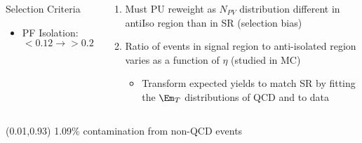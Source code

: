 \begin{frame}
\begin{columns}[T]
\begin{block}{Selection Criteria}
\begin{itemize}
					\begin{itemize}
						\scriptsize
						\item PF Isolation: $<0.12{\rightarrow}>0.2$
					\end{itemize}
				\end{itemize}
			\end{block}
			\vspace*{-0.30cm}
			\begin{block}{}
				\begin{enumerate}
					\scriptsize
					\item Must PU reweight as $N_{PV}$ distribution different in antiIso region than in SR (selection bias)
					\vspace*{-0.1cm}
					\item Ratio of events in signal region to anti-isolated region varies as a function of $\eta$ (studied in MC)
					\begin{itemize}
						\scriptsize
						\item Transform expected yields to match SR by fitting the $\Em_{T}$ distributions of QCD and \Wjets to data
					\end{itemize}
				\end{enumerate}
			\end{block}
	\end{columns}

	\begin{textblock}{0.5}(0.01,0.93)
		\scriptsize 1.09\% contamination from non-QCD events
	\end{textblock}
\end{frame}

